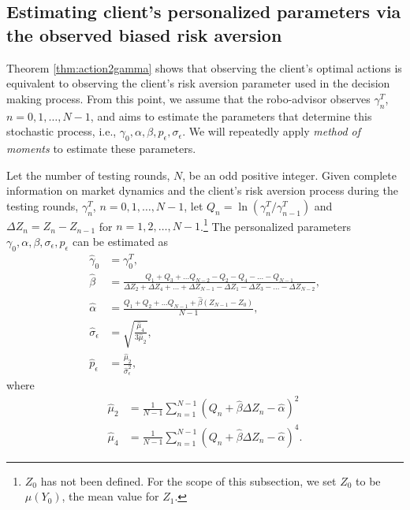 \subsection{Estimating client's personalized parameters via the observed biased risk aversion}
Theorem \ref{thm:action2gamma} shows that observing the client's optimal actions is equivalent to observing the client's risk aversion parameter used in the decision making process. From this point, we assume that the robo-advisor observes $\gamma^T_n$, $n=0,1,\ldots,N-1$, and aims to estimate the parameters that determine this stochastic process, i.e., $\gamma_0,\alpha,\beta,p_\epsilon,\sigma_\epsilon$. We will repeatedly apply \textit{method of moments} \cite{bowman2004estimation} to estimate these parameters.

\begin{theorem}\label{thm:est}
    Let the number of testing rounds, $N$, be an odd positive integer. Given complete information on market dynamics and the client's risk aversion process during the testing rounds, $\gamma_n^T$,  $n=0,1,\ldots, N-1$, let $Q_n=\ln(\gamma_n^T/\gamma_{n-1}^T)$ and $\Delta Z_n=Z_n-Z_{n-1}$ for $n=1,2,\ldots,N-1$.\footnote{$Z_0$ has not been defined. For the scope of this subsection, we set $Z_0$ to be $\mu(Y_0)$, the mean value for $Z_1$.} The personalized parameters $\gamma_0,\alpha,\beta,\sigma_\epsilon,p_\epsilon$ can be estimated as \begin{align*}
        \hat\gamma_0&=\gamma_0^T,\\
        \hat \beta&=\frac{Q_1+Q_3+\ldots Q_{N-2}-Q_2-Q_4-\ldots-Q_{N-1}}{\Delta Z_2+\Delta Z_4+\ldots+\Delta Z_{N-1}-\Delta Z_1-\Delta Z_3-\ldots-\Delta Z_{N-2}},\\
        \hat\alpha&=\frac{Q_1+Q_2+\ldots Q_{N-1}+\hat\beta(Z_{N-1}-Z_0)}{N-1},\\
        \hat\sigma_\epsilon&=\sqrt{\frac{\hat \mu_4}{3\hat\mu_2}},\\
        \hat p_\epsilon&=\frac{\hat\mu_2}{\hat\sigma_\epsilon^2},
    \end{align*} where
        \begin{align*}
            \hat\mu_2&=\frac{1}{N-1}\sum_{n=1}^{N-1} (Q_n+\hat\beta\Delta Z_n-\hat\alpha)^2\\
            \hat\mu_4&=\frac{1}{N-1}\sum_{n=1}^{N-1} (Q_n+\hat\beta\Delta Z_n-\hat\alpha)^4.
        \end{align*}
\end{theorem}
